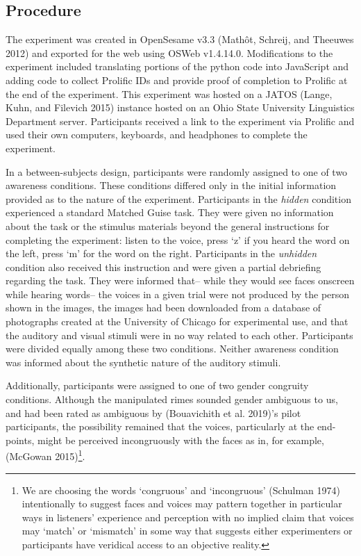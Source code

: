 \documentclass[
  letterpaper,
  DIV=11,
  numbers=noendperiod]{scrartcl}
\begin{document}
\subsection{Procedure}\label{procedure}

The experiment was created in OpenSesame v3.3 (Mathôt, Schreij, and
Theeuwes 2012) and exported for the web using OSWeb v1.4.14.0.
Modifications to the experiment included translating portions of the
python code into JavaScript and adding code to collect Prolific IDs and
provide proof of completion to Prolific at the end of the experiment.
This experiment was hosted on a JATOS (Lange, Kuhn, and Filevich 2015)
instance hosted on an Ohio State University Linguistics Department
server. Participants received a link to the experiment via Prolific and
used their own computers, keyboards, and headphones to complete the
experiment.

In a between-subjects design, participants were randomly assigned to one
of two awareness conditions. These conditions differed only in the
initial information provided as to the nature of the experiment.
Participants in the \emph{hidden} condition experienced a standard
Matched Guise task. They were given no information about the task or the
stimulus materials beyond the general instructions for completing the
experiment: listen to the voice, press `z' if you heard the word on the
left, press `m' for the word on the right. Participants in the
\emph{unhidden} condition also received this instruction and were given
a partial debriefing regarding the task. They were informed that-- while
they would see faces onscreen while hearing words-- the voices in a
given trial were not produced by the person shown in the images, the
images had been downloaded from a database of photographs created at the
University of Chicago for experimental use, and that the auditory and
visual stimuli were in no way related to each other. Participants were
divided equally among these two conditions. Neither awareness condition
was informed about the synthetic nature of the auditory stimuli.

Additionally, participants were assigned to one of two gender congruity
conditions. Although the manipulated rimes sounded gender ambiguous to
us, and had been rated as ambiguous by (Bouavichith et al. 2019)'s pilot
participants, the possibility remained that the voices, particularly at
the end-points, might be perceived incongruously with the faces as in,
for example, (McGowan 2015)\footnote{We are choosing the words
  `congruous' and `incongruous' (Schulman 1974) intentionally to suggest
  faces and voices may pattern together in particular ways in listeners'
  experience and perception with no implied claim that voices may
  `match' or `mismatch' in some way that suggests either experimenters
  or participants have veridical access to an objective reality.}.
\end{document}
